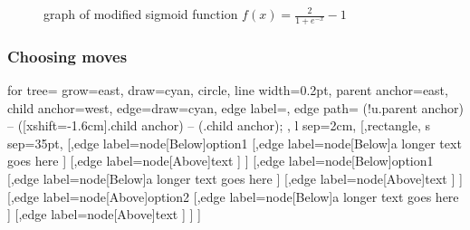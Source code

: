\documentclass{beamer}
\begin{document}
\begin{frame}

	\begin{figure}
			\centering
		
			\caption{graph of modified sigmoid function $f(x)={\frac{2}{1+e^{-x}}- 1}$ \label{sigmoid}}
	\end{figure}
\end{frame}

\begin{frame}
	\frametitle{Choosing moves}

	\begin{forest} 
		for tree={
			grow=east,
			draw=cyan,
			circle,
			line width=0.2pt,
			parent anchor=east,
			child anchor=west,
			edge={draw=cyan},
			edge label={\Huge\color{black}},
			edge path={
				\noexpand{}
					(!u.parent anchor) -- ([xshift=-1.6cm].child anchor) --    
					(.child anchor);
			},
			l sep=2cm,
		} 
		[,rectangle, s sep=35pt,
			[,edge label={node[Below]{option1}}
				[,edge label={node[Below]{a longer text goes here}}
				]
				[,edge label={node[Above]{text}}
				]
			]
			[,edge label={node[Below]{option1}}
				[,edge label={node[Below]{a longer text goes here}}
				]
				[,edge label={node[Above]{text}}
				]
			]
			[,edge label={node[Above]{option2}}
				[,edge label={node[Below]{a longer text goes here}}
				]
				[,edge label={node[Above]{text}}
				]
			]
		]
		\end{forest}
\end{frame}
\end{document}
